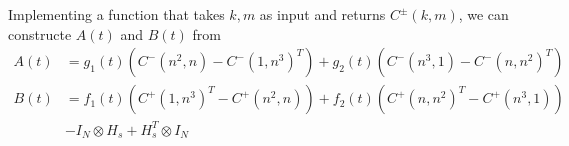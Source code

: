 \documentclass[12pt]{article}
\begin{document}
Implementing a function that takes $k,m$ as input and returns $C^{\pm}(k,m)$, we can constructe $A(t)$ and $B(t)$ from 
\begin{align*}
    A(t)  &= g_1(t) \left( C^-(n^2, n) - C^-(1,n^3)^T  \right) + g_2(t) \left( C^-(n^3, 1) - C^-(n,n^2)^T \right) \\
    B(t) &= f_1(t) \left( C^+(1,n^3)^T - C^+(n^2,n) \right)  + f_2(t) \left( C^+(n,n^2)^T - C^+(n^3,1) \right) \\
         &- I_N \otimes H_s + H_s^T\otimes I_N
\end{align*}
\end{document}
